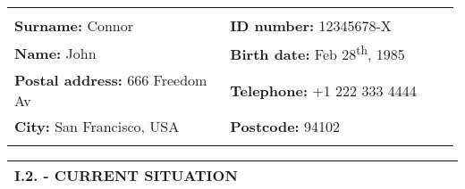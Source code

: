 \documentclass[11pt, letterpaper]{extarticle}
\begin{document}
	\begin{longtable}{L{0.494\linewidth}L{0.494\linewidth}N}
		                                                                                                                                                       &                                                                                                                                                        & \\[-0.25cm]
		\textbf{Surname:} Connor                                                                                                                               & \textbf{ID number:} 12345678-X                                                                                                                         & \\[0.40cm]
		\textbf{Name:} John                                                                                                                                    & \textbf{Birth date:} Feb 28\textsuperscript{th}, 1985                                                                                                  & \\[0.40cm]
		\textbf{Postal address:} 666 Freedom Av                                                                                                                & \textbf{Telephone:} +1 222 333 4444                                                                                                                    & \\[0.40cm]
		\textbf{City:} San Francisco, USA                                                                                                                      & \textbf{Postcode:} 94102                                                                                                                               & \\[0.40cm]
		                                                                                                                                                       &                                                                                                                                                        & \\[-0.25cm] \hline
	\end{longtable}


	\label{sec:I.2.}
	\begin{longtable}{C{1.012\linewidth}N}
		\textbf{\large I.2. - CURRENT SITUATION} & \\[0.70cm] \hline
	\end{longtable}
\end{document}
